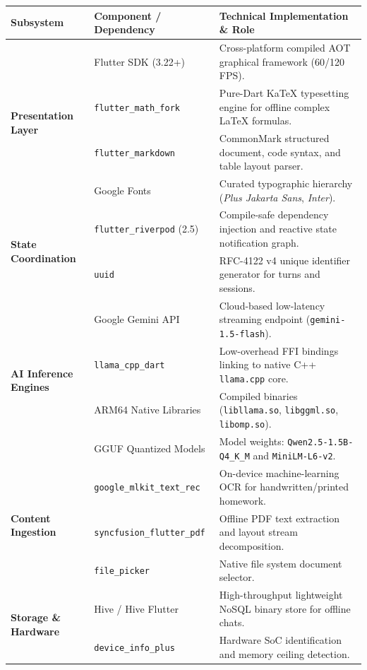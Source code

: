 \documentclass[10.5pt,a4paper]{article}
\begin{document}
\begin{table}[h!]
\centering
\scriptsize
\begin{tabularx}{\textwidth}{llp{7.8cm}}
\toprule
\textbf{Subsystem} & \textbf{Component / Dependency} & \textbf{Technical Implementation \& Role} \\
\midrule
\multirow{4}{*}{\textbf{Presentation Layer}} 
  & Flutter SDK (3.22+) & Cross-platform compiled AOT graphical framework (60/120 FPS). \\
  & \texttt{flutter\_math\_fork} & Pure-Dart KaTeX typesetting engine for offline complex LaTeX formulas. \\
  & \texttt{flutter\_markdown} & CommonMark structured document, code syntax, and table layout parser. \\
  & Google Fonts & Curated typographic hierarchy (\textit{Plus Jakarta Sans}, \textit{Inter}). \\
\midrule
\multirow{2}{*}{\textbf{State Coordination}} 
  & \texttt{flutter\_riverpod} (2.5) & Compile-safe dependency injection and reactive state notification graph. \\
  & \texttt{uuid} & RFC-4122 v4 unique identifier generator for turns and sessions. \\
\midrule
\multirow{4}{*}{\textbf{AI Inference Engines}} 
  & Google Gemini API & Cloud-based low-latency streaming endpoint (\texttt{gemini-1.5-flash}). \\
  & \texttt{llama\_cpp\_dart} & Low-overhead FFI bindings linking to native C++ \texttt{llama.cpp} core. \\
  & ARM64 Native Libraries & Compiled binaries (\texttt{libllama.so}, \texttt{libggml.so}, \texttt{libomp.so}). \\
  & GGUF Quantized Models & Model weights: \texttt{Qwen2.5-1.5B-Q4\_K\_M} and \texttt{MiniLM-L6-v2}. \\
\midrule
\multirow{3}{*}{\textbf{Content Ingestion}} 
  & \texttt{google\_mlkit\_text\_rec} & On-device machine-learning OCR for handwritten/printed homework. \\
  & \texttt{syncfusion\_flutter\_pdf} & Offline PDF text extraction and layout stream decomposition. \\
  & \texttt{file\_picker} & Native file system document selector. \\
\midrule
\multirow{3}{*}{\textbf{Storage \& Hardware}} 
  & Hive / Hive Flutter & High-throughput lightweight NoSQL binary store for offline chats. \\
  & \texttt{device\_info\_plus} & Hardware SoC identification and memory ceiling detection. \\

\end{tabularx}
\end{table}
\end{document}
